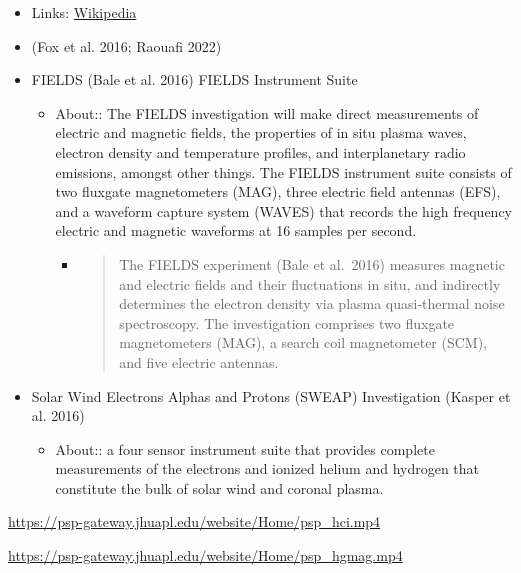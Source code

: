 \documentclass[
  letterpaper,
  DIV=11,
  numbers=noendperiod,
  oneside]{scrartcl}
\providecommand{\tightlist}{%
  \setlength{\itemsep}{0pt}\setlength{\parskip}{0pt}}\usepackage{longtable,booktabs,array}
\begin{document}
\begin{itemize}
\tightlist
\item
  Links:
  \href{https://www.wikiwand.com/en/Parker_Solar_Probe}{Wikipedia}
\item
  (Fox et al. 2016; Raouafi 2022)
\item
  FIELDS (Bale et al. 2016) FIELDS Instrument Suite

  \begin{itemize}
  \tightlist
  \item
    About:: The FIELDS investigation will make direct measurements of
    electric and magnetic fields, the properties of in situ plasma
    waves, electron density and temperature profiles, and interplanetary
    radio emissions, amongst other things. The FIELDS instrument suite
    consists of two fluxgate magnetometers (MAG), three electric field
    antennas (EFS), and a waveform capture system (WAVES) that records
    the high frequency electric and magnetic waveforms at 16 samples per
    second.

    \begin{itemize}
    \item
      \begin{quote}
      The FIELDS experiment (Bale et al.~2016) measures magnetic and
      electric fields and their fluctuations in situ, and indirectly
      determines the electron density via plasma quasi-thermal noise
      spectroscopy. The investigation comprises two fluxgate
      magnetometers (MAG), a search coil magnetometer (SCM), and five
      electric antennas.
      \end{quote}
    \end{itemize}
  \end{itemize}
\item
  Solar Wind Electrons Alphas and Protons (SWEAP) Investigation (Kasper
  et al. 2016)

  \begin{itemize}
  \tightlist
  \item
    About:: a four sensor instrument suite that provides complete
    measurements of the electrons and ionized helium and hydrogen that
    constitute the bulk of solar wind and coronal plasma.
  \end{itemize}
\end{itemize}

\url{https://psp-gateway.jhuapl.edu/website/Home/psp_hci.mp4}

\url{https://psp-gateway.jhuapl.edu/website/Home/psp_hgmag.mp4}
\end{document}
